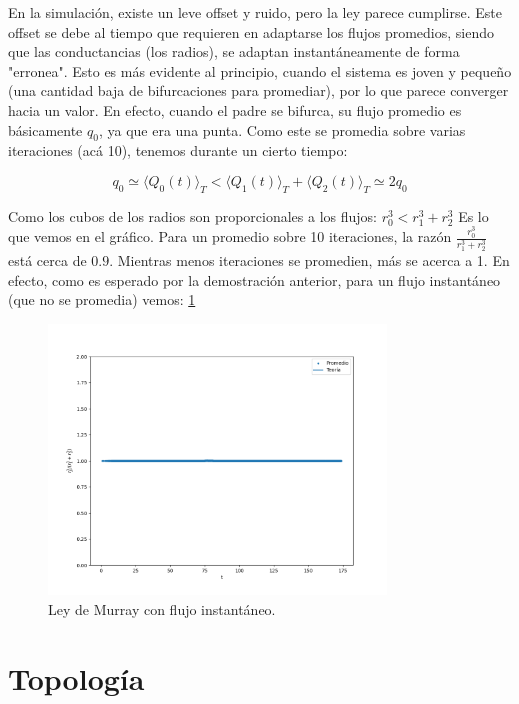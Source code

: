 \documentclass{article}
\begin{document}
En la simulación, existe un leve offset y ruido, pero la ley parece cumplirse. Este offset se debe al tiempo que requieren en adaptarse
los flujos promedios, siendo que las conductancias (los radios), se adaptan instantáneamente de forma "erronea". Esto es más evidente al principio, cuando el sistema es joven y pequeño (una cantidad
baja de bifurcaciones para promediar), por lo que parece converger hacia un valor.
En efecto, cuando el padre se bifurca, su flujo promedio es básicamente $q_0$, ya que era una punta. Como este se promedia sobre varias iteraciones (acá 10), tenemos durante un cierto tiempo:

$$ q_0 \simeq  \langle Q_{0}(t)\rangle_T < \langle Q_{1}(t)\rangle_T + \langle Q_{2}(t)\rangle_T \simeq 2q_0$$

Como los cubos de los radios son proporcionales a los flujos: $r_0^3 < r_1^3 + r_2^3$ Es lo que vemos en el gráfico.
Para un promedio sobre 10 iteraciones, la razón $\frac{r_0^3}{r_1^3+r_2^3}$ está cerca de $0.9$. Mientras menos iteraciones se promedien, más se acerca a 1. En efecto,
como es esperado por la demostración anterior, para un flujo instantáneo (que no se promedia) vemos: \ref{fig:murray_lindo}

\begin{figure}[h!]
    \centering
    \includegraphics[width=0.8\textwidth]{graficos_inst/murray_lindo.png}
    \caption{Ley de Murray con flujo instantáneo.}
    \label{fig:murray_lindo}
\end{figure}
\newpage
\section{Topología}
\end{document}

